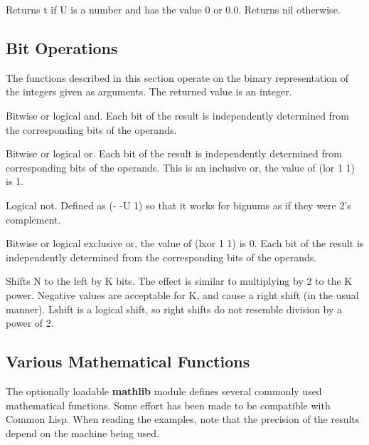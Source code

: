 {    Returns t if  U is a  number and  has the value  0 or   0.0.
    Returns nil otherwise.  }

\subsection{Bit Operations}

  The  functions described in this section operate on the binary
representation of the integers given as arguments.  The returned
value is an integer.


{    Bitwise  or  logical  and.    Each  bit  of  the  result  is
    independently  determined from the corresponding bits of the
    operands.  }

{    Bitwise  or  logical  or.    Each  bit  of  the  result   is
    independently  determined  from  corresponding  bits  of the
    operands.  This is an inclusive or, the value of (lor  1  1)
    is 1. }

{    Logical  not.    Defined  as  (-  -U 1) so that it works for
    bignums as if they were 2's complement.  }

{    Bitwise or logical exclusive or, the value of (lxor 1 1)  is
    0.   Each bit of the result is independently determined from
    the corresponding bits of the operands.  }

{    Shifts N to the left by K bits.  The effect  is  similar  to
    multiplying  by  2  to  the  K  power.   Negative values are
    acceptable for K, and cause a  right  shift  (in  the  usual
    manner).   Lshift is a logical shift, so right shifts do not
    resemble division by a power of 2.  }

\subsection{Various Mathematical Functions}

The optionally loadable {\bf mathlib} module  defines  several
commonly used mathematical functions.  Some effort has been made
to  be  compatible with Common Lisp.  When reading the examples,
note that the precision of the results  depend  on  the  machine
being used.


